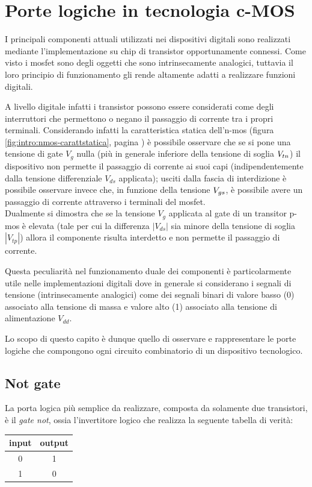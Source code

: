 \chapter{Porte logiche in tecnologia c-MOS}
	
	I principali componenti attuali utilizzati nei dispositivi digitali sono realizzati mediante l'implementazione su chip di transistor opportunamente connessi. Come visto i mosfet sono degli oggetti che sono intrinsecamente analogici, tuttavia il loro principio di funzionamento gli rende altamente adatti a realizzare funzioni digitali.
	
	A livello digitale infatti i transistor possono essere considerati come degli interruttori che permettono o negano il passaggio di corrente tra i propri terminali. Considerando infatti la caratteristica statica dell'n-mos (figura \ref{fig:intro:nmos-carattstatica}, pagina \pageref{fig:intro:nmos-carattstatica}) è possibile osservare che se si pone una tensione di gate $V_g$ nulla (più in generale inferiore della tensione di soglia $V_{tn}$) il dispositivo non permette il passaggio di corrente ai suoi capi (indipendentemente dalla tensione differenziale $V_{ds}$ applicata); usciti dalla fascia di interdizione è possibile osservare invece che, in funzione della tensione $V_{gs}$, è possibile avere un passaggio di corrente attraverso i terminali del mosfet.\\
	Dualmente si dimostra che se la tensione $V_g$ applicata al gate di un transitor p-mos è elevata (tale per cui la differenza $|V_{ds}|$ sia minore della tensione di soglia $|V_{tp}|$) allora il componente risulta interdetto e non permette il passaggio di corrente.
	
	Questa peculiarità nel funzionamento duale dei componenti è particolarmente utile nelle implementazioni digitali dove in generale si considerano i segnali di tensione (intrinsecamente analogici) come dei segnali binari di valore basso (0) associato alla tensione di massa e valore alto (1) associato alla tensione di alimentazione $V_{dd}$.
	
	Lo scopo di questo capito è dunque quello di osservare e rappresentare le porte logiche che compongono ogni circuito combinatorio di un dispositivo tecnologico.

\section{Not gate}
	
	La porta logica più semplice da realizzare, composta da solamente due transistori, è il \textit{gate not}, ossia l'invertitore logico che realizza la seguente tabella di verità:
	\begin{center}
	\begin{tabular}{c | c}
			input & output \\ \hline
			0 & 1 \\ 1 & 0
	\end{tabular}
	\end{center}
	

